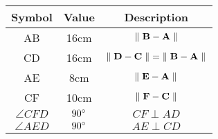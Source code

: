 \begin{tabular}{|c|c|c|}
\hline
Symbol & Value & Description\\
\hline
AB & 16cm & $\|\hspace{0.1cm} \vec{B} - \vec{A} \hspace{0.1cm}\|$ \\
\hline
CD & 16cm & $\|\hspace{0.1cm} \vec{D} - \vec{C} \hspace{0.1cm}\| = \|\hspace{0.1cm} \vec{B} - \vec{A} \hspace{0.1cm}\|$ \\
\hline
AE & 8cm & $\|\hspace{0.1cm} \vec{E} - \vec{A} \hspace{0.1cm}\|$ \\
\hline
CF & 10cm & $\|\hspace{0.1cm} \vec{F} - \vec{C} \hspace{0.1cm}\|$ \\
\hline
$\angle{CFD}$ & $90\degree$ & $CF \perp AD$ \\
\hline
$\angle{AED}$ & $90\degree$ & $AE \perp CD$ \\
\hline
\end{tabular}
